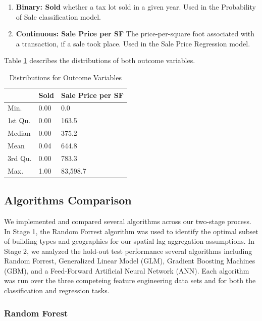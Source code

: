 \documentclass[12pt,]{article}
\providecommand{\tightlist}{%
  \setlength{\itemsep}{0pt}\setlength{\parskip}{0pt}}
\begin{document}
\begin{enumerate}
\def\labelenumi{\arabic{enumi})}
\tightlist
\item
  \textbf{Binary: Sold} whether a tax lot sold in a given year. Used in
  the Probability of Sale classification model.
\item
  \textbf{Continuous: Sale Price per SF} The price-per-square foot
  associated with a transaction, if a sale took place. Used in the Sale
  Price Regression model.
\end{enumerate}

\noindent Table \ref{tab:OutcomeDistro} describes the distributions of
both outcome variables.

\begin{table}

\caption{\label{tab:table 4}\label{tab:OutcomeDistro} Distributions for Outcome Variables}
\centering
\begin{tabular}[t]{lll}
\toprule
  & Sold & Sale Price per SF\\
\midrule
Min. & 0.00 & 0.0\\
1st Qu. & 0.00 & 163.5\\
Median & 0.00 & 375.2\\
Mean & 0.04 & 644.8\\
3rd Qu. & 0.00 & 783.3\\
Max. & 1.00 & 83,598.7\\
\bottomrule
\end{tabular}
\end{table}

\hypertarget{algorithms-comparison}{%
\subsection{Algorithms Comparison}\label{algorithms-comparison}}

We implemented and compared several algorithms across our two-stage
process. In Stage 1, the Random Forrest algorithm was used to identify
the optimal subset of building types and geographies for our spatial lag
aggregation assumptions. In Stage 2, we analyzed the hold-out test
performance several algorithms including Random Forrest, Generalized
Linear Model (GLM), Gradient Boosting Machines (GBM), and a Feed-Forward
Artificial Neural Network (ANN). Each algorithm was run over the three
competeing feature engineering data sets and for both the classification
and regression tasks.

\hypertarget{random-forest}{%
\subsubsection{Random Forest}\label{random-forest}}
\end{document}
